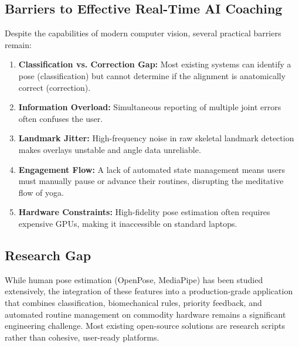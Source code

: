 \subsection{Barriers to Effective Real-Time AI Coaching}
Despite the capabilities of modern computer vision, several practical barriers remain:
\begin{enumerate}
    \item \textbf{Classification vs. Correction Gap:} Most existing systems can identify a pose (classification) but cannot determine if the alignment is anatomically correct (correction).
    \item \textbf{Information Overload:} Simultaneous reporting of multiple joint errors often confuses the user.
    \item \textbf{Landmark Jitter:} High-frequency noise in raw skeletal landmark detection makes overlays unstable and angle data unreliable.
    \item \textbf{Engagement Flow:} A lack of automated state management means users must manually pause or advance their routines, disrupting the meditative flow of yoga.
    \item \textbf{Hardware Constraints:} High-fidelity pose estimation often requires expensive GPUs, making it inaccessible on standard laptops.
\end{enumerate}

\subsection{Research Gap}
While human pose estimation (OpenPose, MediaPipe) has been studied extensively, the integration of these features into a production-grade application that combines classification, biomechanical rules, priority feedback, and automated routine management on commodity hardware remains a significant engineering challenge. Most existing open-source solutions are research scripts rather than cohesive, user-ready platforms.

